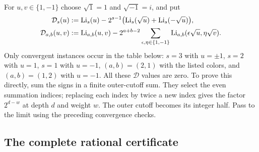 For $u,v\in\{1,-1\}$ choose $\sqrt1=1$ and $\sqrt{-1}=i$, and put
\begin{align}
 \mathcal D_s(u)
 &:=\operatorname{Li}_s(u)-2^{s-1}
       \bigl(\operatorname{Li}_s(\sqrt u)+\operatorname{Li}_s(-\sqrt u)\bigr),
       \label{par:eq:Dsingle}\\
 \mathcal D_{a,b}(u,v)
 &:=\operatorname{Li}_{a,b}(u,v)-2^{a+b-2}
       \sum_{\epsilon,\eta\in\{1,-1\}}
          \operatorname{Li}_{a,b}(\epsilon\sqrt u,\eta\sqrt v).
       \label{par:eq:Ddouble}
\end{align}
Only convergent instances occur in the table below: $s=3$ with $u=\pm1$,
$s=2$ with $u=1$, $s=1$ with $u=-1$, $(a,b)=(2,1)$ with the listed
colors, and $(a,b)=(1,2)$ with $u=-1$.
All these $\mathcal D$ values are zero. To prove this directly, sum the
signs in a finite outer-cutoff sum. They select the even summation indices;
replacing each index by twice a new index gives the factor $2^{d-w}$
at depth $d$ and weight $w$. The outer cutoff becomes its integer half.
Pass to the limit using the preceding convergence checks.

\subsection{The complete rational certificate}

